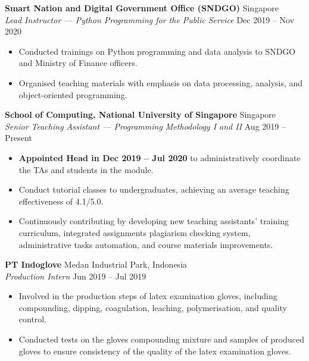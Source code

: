 \documentclass[a4paper, 11pt]{article}
\newcommand{\intraspace}{\vspace{5pt}}
\begin{document}
	\intraspace
	
	\textbf{Smart Nation and Digital Government Office (SNDGO)} \hfill Singapore\\
	\textit{Lead Instructor --- Python Programming for the Public Service} \hfill Dec 2019 -- Nov 2020 
	\begin{itemize}[leftmargin=*, noitemsep, topsep=0pt]
		\item Conducted trainings on Python programming and data analysis to SNDGO and Ministry of Finance officers.
		\item Organised teaching materials with emphasis on data processing, analysis, and object-oriented programming.
	\end{itemize}

	\intraspace
	
	\textbf{School of Computing, National University of Singapore} \hfill Singapore\\
	\textit{Senior Teaching Assistant --- Programming Methodology I and II} \hfill Aug 2019 -- Present
	\begin{itemize}[leftmargin=*, noitemsep, topsep=0pt]
		\item \textbf{Appointed Head in Dec 2019 -- Jul 2020} to administratively coordinate the TAs and students in the module.
		\item Conduct tutorial classes to undergraduates, achieving an average teaching effectiveness of 4.1/5.0.
		\item Continuously contributing by developing new teaching assistants' training curriculum, integrated assignments plagiarism checking system, administrative tasks automation, and course materials improvements.
	\end{itemize}
	
	\intraspace
	
	\textbf{PT Indoglove} \hfill Medan Industrial Park, Indonesia\\
	\textit{Production Intern} \hfill Jun 2019 -- Jul 2019
	\begin{itemize}[leftmargin=*, noitemsep, topsep=0pt]
		\item Involved in the production steps of latex examination gloves, including compounding, dipping, coagulation, leaching, polymerisation, and quality control.
		\item Conducted tests on the gloves compounding mixture and samples of produced gloves to ensure consistency of the quality of the latex examination gloves.
	\end{itemize}
	
\end{document}
